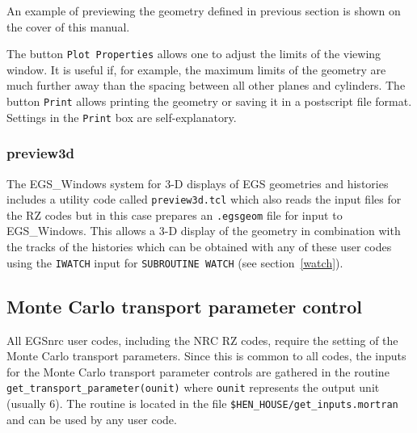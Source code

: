 \documentclass[12pt,twoside]{article}  %
\begin{document}
An example of previewing the geometry defined in previous
section is shown on the cover of this manual.

\noindent
The button \verb+Plot Properties+ allows one to adjust the
limits of the viewing window. It  is useful if, for example, 
the maximum limits of the geometry are much further away than 
the spacing between all other planes and cylinders.
The button \verb+Print+ allows printing the geometry or saving it in a
postscript file format. Settings
in the \verb+Print+ box are self-explanatory.


\subsubsection{preview3d}

 
 
The EGS\_Windows system for 3-D displays of EGS geometries and
histories\cite{TR99a} includes a utility code called {\tt preview3d.tcl}
which also reads the input files for the RZ codes but in this case prepares
an {\tt .egsgeom} file for input to EGS\_Windows. This allows a 3-D display
of the geometry in combination with the tracks of the histories which can
be obtained with any of these user codes using the {\tt IWATCH} input for
{\tt SUBROUTINE WATCH} (see section~\ref{watch}). 



\subsection{Monte Carlo transport parameter control}
\label{mctpsect}


All EGSnrc user codes, including the NRC RZ codes, require
the setting of the Monte Carlo transport parameters. Since this
is common to all codes, the inputs for the Monte Carlo transport 
parameter controls are gathered in the routine
\verb+get_transport_parameter(ounit)+ where \verb+ounit+ represents
the output unit (usually 6). The routine is located in the 
file \verb+$HEN_HOUSE/get_inputs.mortran+ and can be used by any user code. 
\end{document}
